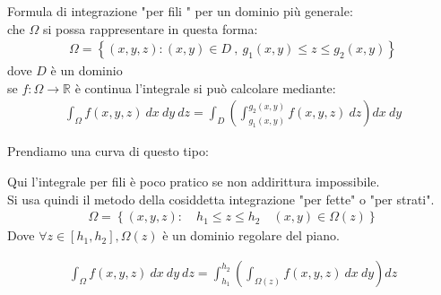 \documentclass[a4paper, oneside]{article}
\begin{document}
\begin{proposition}
  Formula di integrazione "per fili " per un dominio più generale:\\
   che $\Omega$ si possa rappresentare in questa forma:
  \begin{gather*}
    \Omega = \left\{ (x,y,z) : (x,y) \in D \ , \ g_1(x,y) \leq z \leq g_2(x,y) \right\} 
  \end{gather*}
  dove $D$ è un dominio\\
   se $f:\Omega \to \mathbb{R}$ è continua l'integrale si può calcolare mediante:
  \begin{gather*}
    \int_\Omega f(x,y,z) \ dx \ dy \ dz = \int_D \left( \int_{g_1(x,y)}^{g_2(x,y)} f(x,y,z) \ dz \right) dx \ dy
  \end{gather*}
\end{proposition}


Prendiamo una curva di questo tipo:
\begin{center}
\end{center}


Qui l'integrale per fili è poco pratico se non addirittura impossibile.\\
Si usa quindi il metodo della cosiddetta integrazione "per fette" o "per strati".\\
\begin{gather*}
  \Omega = \left\{ (x,y,z) : \quad h_1 \leq z \leq h_2 \quad (x,y)\in\Omega (z) \right\} 
\end{gather*}
Dove $\forall z \in[h_1, h_2] , \Omega(z)$ è un dominio regolare del piano.\\


\begin{proposition}
  \begin{gather*}
    \int_\Omega f(x,y,z) \ dx \ dy \ dz = \int_{h_1}^{h_2} \left( \int_{\Omega(z)} f(x,y,z) \ dx \ dy \right) dz
  \end{gather*}
\end{proposition}
\end{document}
